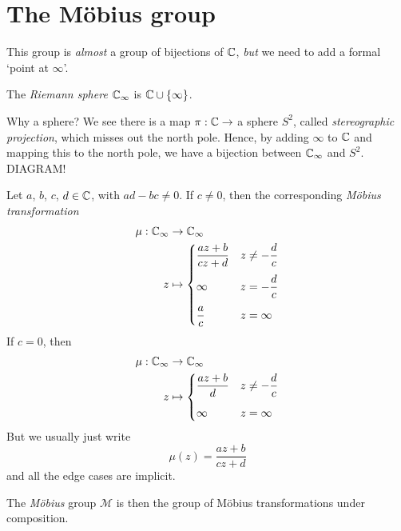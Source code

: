 \documentclass{../../template/note}
\begin{document}
    
    
    


    \section{The M\"obius group}

    This group is \emph{almost} a group of bijections of \(\mathbb C\), \emph{but} we need to add a formal `point at \(\infty\)'.

    \begin{definition}
        The \emph{Riemann sphere} \(\mathbb C_\infty\) is \(\mathbb C \cup \{\infty\}\).
    \end{definition}
    
    \begin{remark*}
        Why a sphere? We see there is a map \(\pi: \mathbb C \to\) a sphere \(S^2\), called \emph{stereographic projection}, which misses out the north pole. Hence, by adding \(\infty\) to \(\mathbb C\) and mapping this to the north pole, we have a bijection between \(\mathbb C_\infty\) and \(S^2\).
        DIAGRAM!
    \end{remark*}
    
    \begin{definition}
        Let \(a\), \(b\), \(c\), \(d \in \mathbb C\), with \(ad - bc \neq 0\). If \(c \neq 0\), then the corresponding \emph{M\"obius transformation}
        \begin{align*}
            \mu: \mathbb C_\infty &\to \mathbb C_\infty \\
            z &\mapsto \begin{cases}
                \displaystyle \frac{az+b}{cz+d} & \displaystyle z \neq -\frac{d}{c} \\[10pt]
                \infty & \displaystyle z = -\frac{d}{c} \\[10pt]
                \displaystyle \frac{a}{c} & z = \infty
            \end{cases}
        \end{align*}
        If \(c = 0\), then
        \begin{align*}
            \mu: \mathbb C_\infty &\to \mathbb C_\infty \\
            z &\mapsto \begin{cases}
                \displaystyle \frac{az+b}{d} & \displaystyle z \neq -\frac{d}{c} \\[10pt]
                \infty & z = \infty
            \end{cases}
        \end{align*}
        But we usually just write
        \[
            \mu(z) = \frac{az+b}{cz+d}
        \]
        and all the edge cases are implicit.

        The \emph{M\"obius} group \(\mathcal M\) is then the group of M\"obius transformations under composition.
    \end{definition}
    
\end{document}
